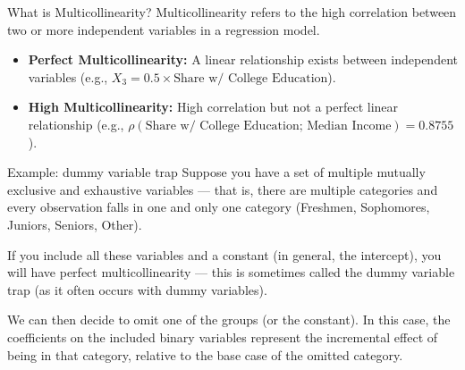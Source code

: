 \documentclass[notes,10pt, aspectratio=169]{beamer}
\begin{document}
\begin{frame}{What is Multicollinearity?}
 Multicollinearity refers to the high correlation between two or more independent variables in a regression model.\\[1em]
  \begin{itemize}
    \item \textbf{Perfect Multicollinearity:} A linear relationship exists between independent variables (e.g., $X_3 =0.5 \times  \text{Share w/ College Education}$).\\[1em]
    \item \textbf{High Multicollinearity:} High correlation but not a perfect linear relationship (e.g., $\rho(\text{Share w/ College Education; Median Income})=0.8755$).\\[1em]
  \end{itemize}
\end{frame}



\begin{frame}{Example: dummy variable trap}
Suppose you have a set of multiple mutually exclusive and exhaustive variables  --- that is, there are multiple categories and every observation falls in one and only one category (Freshmen, Sophomores, Juniors, Seniors, Other).\\ \vspace{.5cm}

If you include all these variables and a constant (in general, the intercept), you will have perfect multicollinearity --- this is sometimes called the dummy variable trap (as it often occurs with dummy variables).\\ \vspace{.5cm}

We can then decide to omit one of the groups (or the constant). In this case, the coefficients on the included binary variables represent the incremental effect of being in that category, relative to the base case of the omitted category.

\end{frame}
\end{document}
